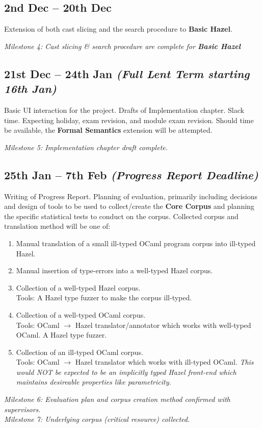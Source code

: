 \subsection*{2nd Dec -- 20th Dec}
Extension of both cast slicing and the search procedure to \textbf{Basic Hazel}.\par 
\textit{Milestone 4: Cast slicing \& search procedure are complete for \textbf{Basic Hazel}}

\subsection*{21st Dec -- 24th Jan \textit{(Full Lent Term starting 16th Jan)}}
Basic UI interaction for the project. Drafts of Implementation chapter. Slack time. Expecting holiday, exam revision, and module exam revision. Should time be available, the \textbf{Formal Semantics} extension will be attempted.\par
\textit{Milestone 5: Implementation chapter draft complete.}

\subsection*{25th Jan -- 7th Feb \textit{(Progress Report Deadline)}}
Writing of Progress Report. Planning of evaluation, primarily including decisions and design of tools to be used to collect/create the \textbf{Core Corpus} and planning the specific statistical tests to conduct on the corpus. Collected corpus and translation method will be one of:
\begin{enumerate}
\item Manual translation of a small ill-typed OCaml program corpus into ill-typed Hazel.
\item Manual insertion of type-errors into a well-typed Hazel corpus.
\item Collection of a well-typed Hazel corpus.\\ 
Tools: A Hazel type fuzzer to make the corpus ill-typed.
\item Collection of a well-typed OCaml corpus.
\\Tools: OCaml $\to$ Hazel translator/annotator which works with well-typed OCaml. A Hazel type fuzzer.
\item Collection of an ill-typed OCaml corpus. 
\\Tools: OCaml $\to$ Hazel translator which works with ill-typed OCaml. \textit{This would NOT be expected to be an implicitly typed Hazel front-end which maintains desireable properties like parametricity.} 
\end{enumerate}
\textit{Milestone 6: Evaluation plan and corpus creation method confirmed with supervisors.}\\
\textit{Milestone 7: Underlying corpus (critical resource) collected.}

